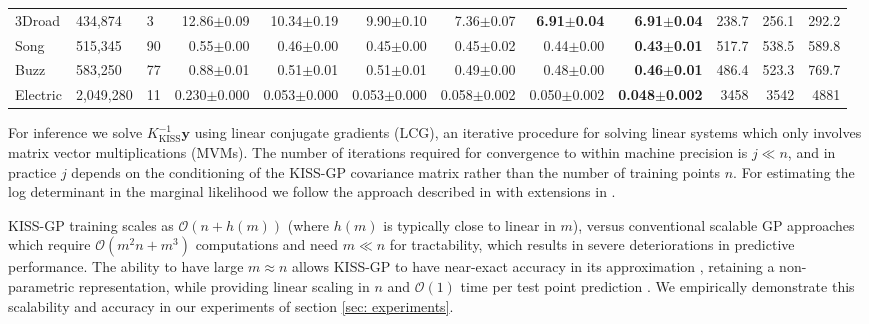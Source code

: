 \documentclass[twoside,11pt]{article}
\newcommand{\mbf}[1]{{\boldsymbol{\mathbf{#1}}}}
\renewcommand{\bm}{\mbf}
\begin{document}
\begin{table*}[tbhp]
\begin{tabular}{@{}L{42pt}  R{40pt}  R{20pt}  r  r  r  r  r  r r r r}
    3Droad & 434,874 & 3  & 12.86$\pm$0.09 & 10.34$\pm$0.19 & 9.90$\pm$0.10 &
                         7.36$\pm$0.07 & {\bf 6.91$\pm$0.04} & {\bf 6.91$\pm$0.04} &
                         238.7 & 256.1 & 292.2 \\

    Song & 515,345 & 90 & 0.55$\pm$0.00 & 0.46$\pm$0.00 & 0.45$\pm$0.00 &
                      0.45$\pm$0.02 &  0.44$\pm$0.00 &  {\bf 0.43$\pm$0.01} &
                      517.7 & 538.5 & 589.8 \\

    Buzz & 583,250 & 77  & 0.88$\pm$0.01 & 0.51$\pm$0.01 & 0.51$\pm$0.01 &
                       0.49$\pm$0.00 & 0.48$\pm$0.00 &  {\bf 0.46$\pm$0.01} &
                       486.4 & 523.3 & 769.7 \\

    Electric & 2,049,280 & 11 & 0.230$\pm$0.000 & 0.053$\pm$0.000 & 0.053$\pm$0.000 &
                       0.058$\pm$0.002 & 0.050$\pm$0.002 & {\bf 0.048$\pm$0.002} &
                       3458 & 3542 & 4881 \\
\cmidrule[\heavyrulewidth](r){1-9} \cmidrule[\heavyrulewidth](l){10-12}
\end{tabular}
\label{tab:uci}
\vspace{-10pt}
\end{table*}

 
\restoregeometry

For inference we solve $K_{\text{KISS}}^{-1} \bm{y}$ using linear conjugate gradients (LCG), an
iterative procedure for solving linear systems which only involves matrix vector multiplications (MVMs).
The number of iterations required for convergence to within machine precision is
$j \ll n$, and in practice $j$ depends on the conditioning of the KISS-GP covariance matrix
rather than the number of training points $n$.  For estimating the log determinant in
the marginal likelihood we follow the approach described in \citet{wilsonnickisch2015} 
with extensions in \citet{wdn2015}.

KISS-GP training scales as $\mathcal{O}(n + h(m))$ (where $h(m)$ is typically close to linear
in $m$), versus conventional scalable GP approaches which require $\mathcal{O}(m^2 n + m^3)$
\citep{quinonero2005unifying}
computations and need $m \ll n$ for tractability, which results in severe deteriorations in
predictive performance.  The ability to have large $m \approx n$ allows KISS-GP to have near-exact
accuracy in its approximation \citep{wilsonnickisch2015}, retaining a non-parametric representation, while providing linear scaling
in $n$ and $\mathcal{O}(1)$ time per test point prediction \citep{wdn2015}.  We empirically demonstrate this
scalability and accuracy in our experiments of section \ref{sec: experiments}.
\end{document}
